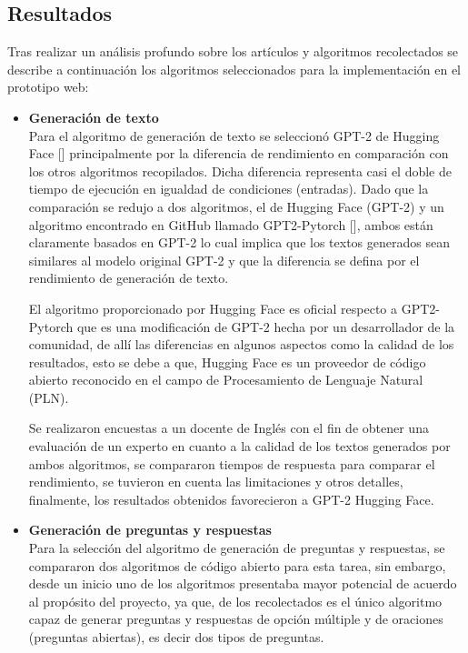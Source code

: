 \documentclass[../Main.tex]{subfiles}
\begin{document}
\subsection{Resultados}
\begin{justify}
Tras realizar un análisis profundo sobre los artículos y algoritmos recolectados se describe a continuación los algoritmos seleccionados para la implementación en el prototipo web:

\begin{itemize}
    \item \textbf{Generación de texto}\\
    Para el algoritmo de generación de texto se seleccionó GPT-2 de Hugging Face [] principalmente por la diferencia de rendimiento en comparación con los otros algoritmos recopilados. Dicha diferencia representa casi el doble de tiempo de ejecución en igualdad de condiciones (entradas). Dado que la comparación se redujo a dos algoritmos, el de Hugging Face (GPT-2) y un algoritmo encontrado en GitHub llamado GPT2-Pytorch [], ambos están claramente basados en GPT-2 lo cual implica que los textos generados sean similares al modelo original GPT-2 y que la diferencia se defina por el rendimiento de generación de texto.
    
    El algoritmo proporcionado por Hugging Face es oficial respecto a GPT2-Pytorch que es una modificación de GPT-2 hecha por un desarrollador de la comunidad, de allí las diferencias en algunos aspectos como la calidad de los resultados, esto se debe a que, Hugging Face es un proveedor de código abierto reconocido en el campo de Procesamiento de Lenguaje Natural (PLN).
    
    Se realizaron encuestas a un docente de Inglés con el fin de obtener una evaluación de un experto en cuanto a la calidad de los textos generados por ambos algoritmos, se compararon tiempos de respuesta para comparar el rendimiento, se tuvieron en cuenta las limitaciones y otros detalles, finalmente, los resultados obtenidos favorecieron a GPT-2 Hugging Face.
    
    \item \textbf{Generación de preguntas y respuestas}\\
    Para la selección del algoritmo de generación de preguntas y respuestas, se compararon dos algoritmos de código abierto para esta tarea, sin embargo, desde un inicio uno de los algoritmos presentaba mayor potencial de acuerdo al propósito del proyecto, ya que, de los recolectados es el único algoritmo capaz de generar preguntas y respuestas de opción múltiple y de oraciones (preguntas abiertas), es decir dos tipos de preguntas.
    

\end{itemize}
\end{justify}
\end{document}
